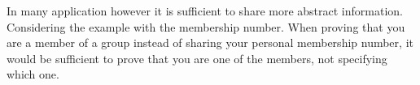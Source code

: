 
In many application however it is sufficient to share more abstract information. Considering the example with the membership number. When proving that you are a member of a group instead of sharing your personal membership number, it would be sufficient to prove that you are one of the members, not specifying which one. %


